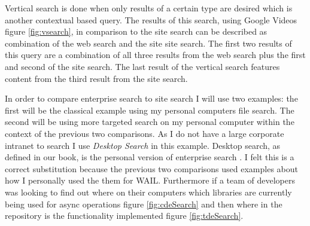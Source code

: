 \documentclass[11pt]{article}
\begin{document}
Vertical search is done when only results of a certain type are desired which is another contextual based query. The results of this search, using Google Videos figure \hyperref[fig:vsearch]{\ref{fig:vsearch}}, in comparison to the site search can be described as combination of the web search and the site site search. The first two results of this query are a combination of all three results from the web search plus the first and second of the site search. The last result of the vertical search features content from the third result from the site search. 
\newline 

In order to compare enterprise search to site search I will use two examples: the first will be the classical example using my personal computers file search. The second will be using more targeted search on my personal computer within the context of the previous two comparisons. As I do not have a large corporate intranet to search I use \emph{Desktop Search} in this example. Desktop search, as defined in our book, is the personal version of enterprise search \citep[pp. 3]{CroftMetzlerStrohman200902}. I felt this is a correct substitution because the previous two comparisons used examples about how I personally used the them for WAIL. Furthermore if a team of developers was looking to find out where on their computers which libraries are currently being used for async operations figure \hyperref[fig:cdeSearch]{\ref{fig:cdeSearch}} and then where in the repository is the functionality implemented figure \hyperref[fig:tdeSearch]{\ref{fig:tdeSearch}}.
\end{document}
